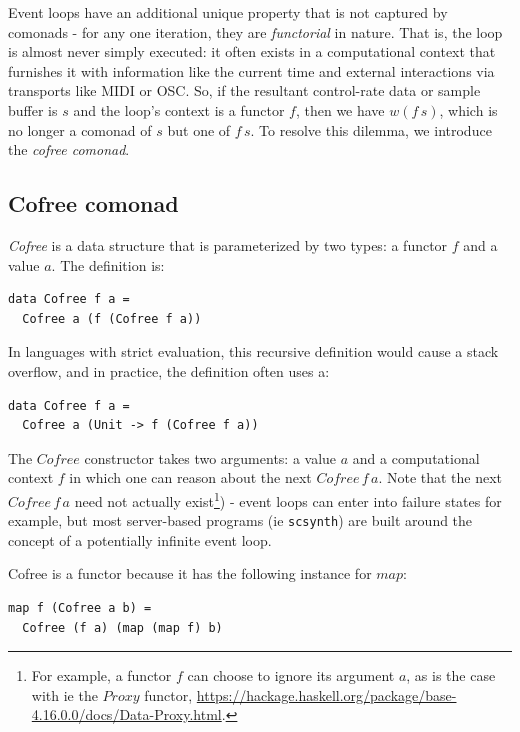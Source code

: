 \documentclass{article}
\begin{document}
Event loops have an additional unique property that is not captured by comonads - for any one iteration, they are \textit{functorial} in nature. That is, the loop is almost never simply executed: it often exists in a computational context that furnishes it with information like the current time and external interactions via transports like MIDI or OSC. So, if the resultant control-rate data or sample buffer is $s$ and the loop's context is a functor $f$, then we have $w (f\,s)$, which is no longer a comonad of $s$ but one of $f\,s$. To resolve this dilemma, we introduce the \textit{cofree comonad}.

\subsection{Cofree comonad}

\textit{Cofree} is a data structure that is parameterized by two types: a functor $f$ and a value $a$. The definition is:

\lstset{language=Haskell, style=psstyle}
\begin{lstlisting}
data Cofree f a =
  Cofree a (f (Cofree f a))
\end{lstlisting}

In languages with strict evaluation, this recursive definition would cause a stack overflow, and in practice, the definition often uses a:

\lstset{language=Haskell, style=psstyle}
\begin{lstlisting}
data Cofree f a =
  Cofree a (Unit -> f (Cofree f a))
\end{lstlisting}

The $Cofree$ constructor takes two arguments: a value $a$ and a computational context $f$ in which one can reason about the next $Cofree\,f\,a$. Note that the next $Cofree\,f\,a$ need not actually exist\footnote{For example, a functor $f$ can choose to ignore its argument $a$, as is the case with ie the $Proxy$ functor, \url{https://hackage.haskell.org/package/base-4.16.0.0/docs/Data-Proxy.html}.}) - event loops can enter into failure states for example, but most server-based programs (ie \texttt{scsynth}) are built around the concept of a potentially infinite event loop.

Cofree is a functor because it has the following instance for $map$:

\lstset{language=Haskell, style=psstyle}
\begin{lstlisting}
map f (Cofree a b) =
  Cofree (f a) (map (map f) b)
\end{lstlisting}
\end{document}
